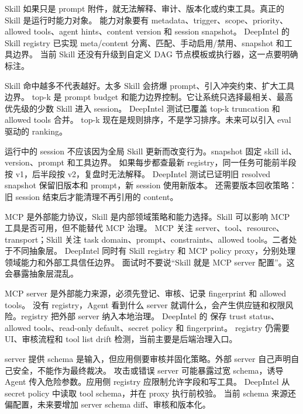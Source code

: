 {Skill 如果只是 prompt 附件，就无法解释、审计、版本化或约束工具。真正的 Skill 是运行时能力对象。}
{能力对象要有 metadata、trigger、scope、priority、allowed tools、agent hints、content version 和 session snapshot。}
{DeepIntel 的 Skill registry 已实现 meta/content 分离、匹配、手动启用/禁用、snapshot 和工具边界。}
{当前 Skill 还没有升级到自定义 DAG 节点模板或执行器，这一点要明确标注。}

{Skill 命中越多不代表越好。太多 Skill 会挤爆 prompt、引入冲突约束、扩大工具边界。}
{top-k 是 prompt budget 和能力边界控制。它让系统只选择最相关、最高优先级的少数 Skill 进入 session。}
{DeepIntel 测试已覆盖 top-k truncation 和 allowed tools 合并。}
{top-k 现在是规则排序，不是学习排序。未来可以引入 eval 驱动的 ranking。}

{运行中的 session 不应该因为全局 Skill 更新而改变行为。snapshot 固定 skill id、version、prompt 和工具边界。}
{如果每步都查最新 registry，同一任务可能前半段按 v1，后半段按 v2，复盘时无法解释。}
{DeepIntel 测试已证明旧 resolved snapshot 保留旧版本和 prompt，新 session 使用新版本。}
{还需要版本回收策略：旧 session 结束后才能清理不再引用的 content。}

{MCP 是外部能力协议，Skill 是内部领域策略和能力选择。Skill 可以影响 MCP 工具是否可用，但不能替代 MCP 治理。}
{MCP 关注 server、tool、resource、transport；Skill 关注 task domain、prompt、constraints、allowed tools。二者处于不同抽象层。}
{DeepIntel 同时有 Skill registry 和 MCP policy proxy，分别处理领域能力和外部工具信任边界。}
{面试时不要说“Skill 就是 MCP server 配置”。这会暴露抽象层混乱。}

{MCP server 是外部能力来源，必须先登记、审核、记录 fingerprint 和 allowed tools。}
{没有 registry，Agent 看到什么 server 就调什么，会产生供应链和权限风险。registry 把外部 server 纳入本地治理。}
{DeepIntel 的  保存 trust status、allowed tools、read-only default、secret policy 和 fingerprint。}
{registry 仍需要 UI、审核流程和 tool list drift 检测，当前主要是后端治理入口。}

{server 提供 schema 是输入，但应用侧要审核并固化策略。外部 server 自己声明自己安全，不能作为最终裁决。}
{攻击或错误 server 可能暴露过宽 schema，诱导 Agent 传入危险参数。应用侧 registry 应限制允许字段和写工具。}
{DeepIntel 从 secret policy 中读取 tool schema，并在 proxy 执行前校验。}
{当前 schema 来源还偏配置，未来要增加 server schema diff、审核和版本化。}


